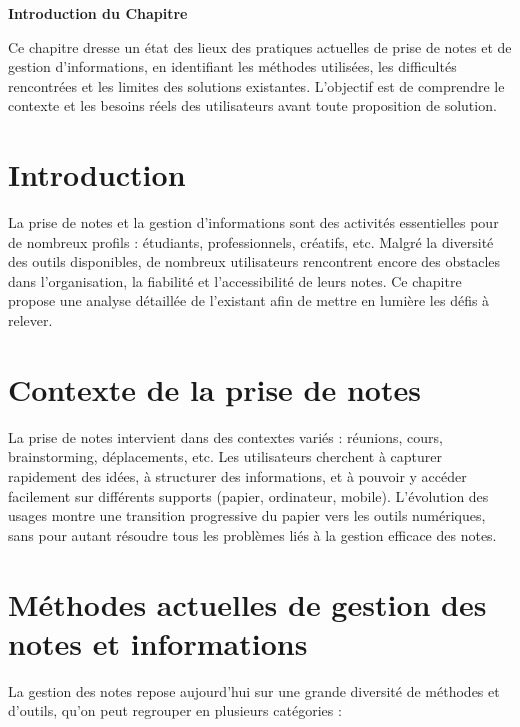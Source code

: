 
\begin{center}
\textbf{\large Introduction du Chapitre}
\end{center}

\noindent
Ce chapitre dresse un état des lieux des pratiques actuelles de prise de notes et de gestion d’informations, en identifiant les méthodes utilisées, les difficultés rencontrées et les limites des solutions existantes. L’objectif est de comprendre le contexte et les besoins réels des utilisateurs avant toute proposition de solution.

\section{Introduction}

La prise de notes et la gestion d’informations sont des activités essentielles pour de nombreux profils : étudiants, professionnels, créatifs, etc. Malgré la diversité des outils disponibles, de nombreux utilisateurs rencontrent encore des obstacles dans l’organisation, la fiabilité et l’accessibilité de leurs notes. Ce chapitre propose une analyse détaillée de l’existant afin de mettre en lumière les défis à relever.

\section{Contexte de la prise de notes}

La prise de notes intervient dans des contextes variés : réunions, cours, brainstorming, déplacements, etc. Les utilisateurs cherchent à capturer rapidement des idées, à structurer des informations, et à pouvoir y accéder facilement sur différents supports (papier, ordinateur, mobile). L’évolution des usages montre une transition progressive du papier vers les outils numériques, sans pour autant résoudre tous les problèmes liés à la gestion efficace des notes.

\section{Méthodes actuelles de gestion des notes et informations}

La gestion des notes repose aujourd’hui sur une grande diversité de méthodes et d’outils, qu’on peut regrouper en plusieurs catégories :

